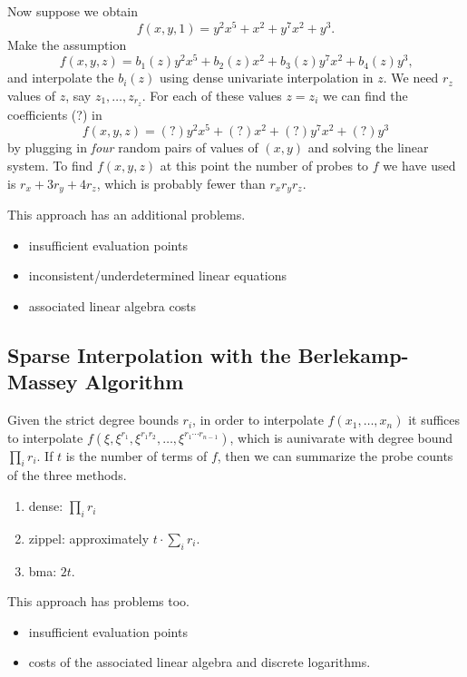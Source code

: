 \documentclass[11pt,reqno]{amsart}
\numberwithin{equation}{section}
\begin{document}
Now suppose we obtain
\begin{equation*}
f(x,y,1) = y^2 x^5 + x^2 + y^7 x^2 + y^3.
\end{equation*}
Make the assumption
\begin{equation*}
f(x,y,z) = b_1(z)y^2 x^5 + b_2(z)x^2 + b_3(z)y^7 x^2 + b_4(z)y^3\text{,}
\end{equation*}
and interpolate the $b_i(z)$ using dense univariate interpolation in $z$. We
need $r_z$ values of $z$, say $z_1, \dots, z_{r_z}$. For each of these values
$z=z_i$ we can find the coefficients (?) in
\begin{equation*}
f(x,y,z) = (?)y^2 x^5 + (?)x^2 + (?)y^7 x^2 + (?)y^3
\end{equation*}
by plugging in \emph{four} random pairs of values of $(x,y)$ and solving the
linear system. To find $f(x,y,z)$ at this point the number of probes to $f$ we 
have used is $r_x + 3r_y + 4r_z$, which is probably fewer than $r_x r_y r_z$.

This approach has an additional problems.
\begin{itemize}
\item insufficient evaluation points
\item inconsistent/underdetermined linear equations
\item associated linear algebra costs
\end{itemize}

\subsection{Sparse Interpolation with the Berlekamp-Massey Algorithm}
Given the strict degree bounds $r_i$, in order to interpolate
$f(x_1, \dots, x_n)$ it suffices to interpolate
$f(\xi, \xi^{r_1}, \xi^{r_1 r_2}, \dots, \xi^{r_1 \cdots r_{n-1}})$, which is aunivarate with degree bound $\prod_i r_i$. If $t$ is the number of terms of
$f$, then we can summarize the probe counts of the three methods.
\begin{enumerate}
\item dense: $\prod_i r_i$
\item zippel: approximately $t \cdot \sum_i r_i$.
\item bma: $2t$.
\end{enumerate}

This approach has problems too.
\begin{itemize}
\item insufficient evaluation points
\item costs of the associated linear algebra and discrete logarithms.
\end{itemize}
\end{document}
